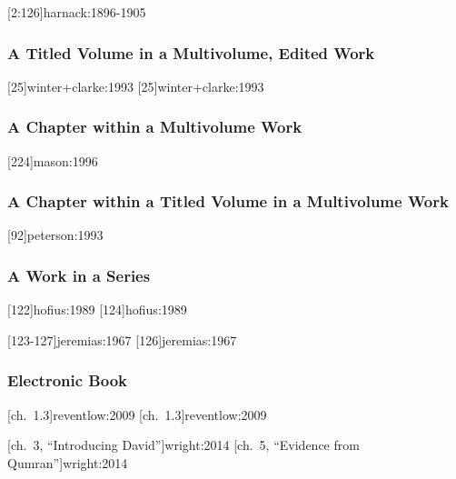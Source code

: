 \documentclass[a4paper]{article}
\begin{document}
[2:126]{harnack:1896-1905}

\subsubsection{A Titled Volume in a Multivolume, Edited Work}

[25]{winter+clarke:1993}
[25]{winter+clarke:1993}

\subsubsection{A Chapter within a Multivolume Work}

[224]{mason:1996}

\subsubsection{A Chapter within a Titled Volume in a Multivolume Work}

[92]{peterson:1993}

\subsubsection{A Work in a Series}

[122]{hofius:1989}
[124]{hofius:1989}

[123-127]{jeremias:1967}
[126]{jeremias:1967}

\subsubsection{Electronic Book}

[ch.~1.3]{reventlow:2009}
[ch.~1.3]{reventlow:2009}

[ch.~3, \mkbibquote{Introducing David}]{wright:2014}
[ch.~5, \mkbibquote{Evidence from Qumran}]{wright:2014}

\end{document}
